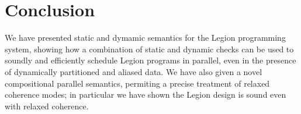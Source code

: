 
\section{Conclusion}
\label{sect:conclusion}

We have presented static and dymamic semantics for the Legion programming system,
showing how a combination of static and dynamic checks can be used to soundly and efficiently schedule
Legion programs in parallel, even in the presence of dynamically partitioned and aliased data.  We have
also given a novel compositional parallel semantics, permiting a precise treatment of relaxed coherence modes;
in particular we have shown the Legion design is sound even with relaxed coherence.


